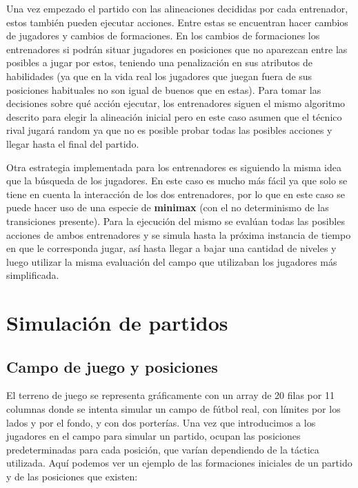 \documentclass{article}
\begin{document}
Una vez empezado el partido con las alineaciones decididas por cada entrenador, estos también pueden ejecutar 
acciones. Entre estas se encuentran hacer cambios de jugadores y cambios de formaciones. En los cambios de 
formaciones los entrenadores si podrán situar jugadores en posiciones que no aparezcan entre las posibles a jugar 
por estos, teniendo una penalización en sus atributos de habilidades (ya que en la vida real los jugadores que juegan 
fuera de sus posiciones habituales no son igual de buenos que en estas). Para tomar las decisiones sobre qué acción 
ejecutar, los entrenadores siguen el mismo algoritmo descrito para elegir la alineación inicial pero en este caso 
asumen que el técnico rival jugará random ya que no es posible probar todas las posibles acciones y llegar hasta el 
final del partido.

Otra estrategia implementada para los entrenadores es siguiendo la misma idea que la búsqueda de los jugadores.
En este caso es mucho más fácil ya que solo se tiene en cuenta la interacción de los dos entrenadores, por lo que en este
caso se puede hacer uso de una especie de \textbf{minimax} (con el no determinismo de las transiciones presente). Para la ejecución del mismo
se evalúan todas las posibles acciones de ambos entrenadores y se simula hasta la próxima instancia de tiempo en que le corresponda
jugar, así hasta llegar a bajar una cantidad de niveles y luego utilizar la misma evaluación del campo que utilizaban los jugadores
más simplificada.   

\section{Simulación de partidos}
\subsection{Campo de juego y posiciones}
El terreno de juego se representa gráficamente con un
array de 20 filas por 11 columnas donde se intenta simular un campo de fútbol real, con límites por los lados y por 
el fondo, y con dos porterías. Una vez que introducimos a los jugadores en el campo para simular un partido, ocupan 
las posiciones predeterminadas para cada posición, que varían dependiendo de la táctica utilizada. Aquí podemos ver 
un ejemplo de las formaciones iniciales de un partido y de las posiciones que existen: 
\end{document}
